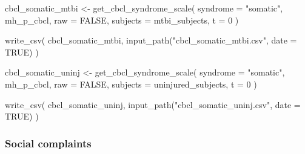 \documentclass[
  letterpaper,
  DIV=11,
  numbers=noendperiod]{scrreprt}
\newenvironment{Shaded}{\begin{snugshade}}{\end{snugshade}}
\newcommand{\AttributeTok}[1]{\textcolor[rgb]{0.40,0.45,0.13}{#1}}
\newcommand{\ConstantTok}[1]{\textcolor[rgb]{0.56,0.35,0.01}{#1}}
\newcommand{\DecValTok}[1]{\textcolor[rgb]{0.68,0.00,0.00}{#1}}
\newcommand{\FunctionTok}[1]{\textcolor[rgb]{0.28,0.35,0.67}{#1}}
\newcommand{\NormalTok}[1]{\textcolor[rgb]{0.00,0.23,0.31}{#1}}
\newcommand{\OtherTok}[1]{\textcolor[rgb]{0.00,0.23,0.31}{#1}}
\newcommand{\StringTok}[1]{\textcolor[rgb]{0.13,0.47,0.30}{#1}}
\begin{document}
\begin{Shaded}
\begin{Highlighting}[]
\NormalTok{cbcl\_somatic\_mtbi }\OtherTok{\textless{}{-}} \FunctionTok{get\_cbcl\_syndrome\_scale}\NormalTok{(}
    \AttributeTok{syndrome =} \StringTok{"somatic"}\NormalTok{,}
\NormalTok{    mh\_p\_cbcl,}
    \AttributeTok{raw =} \ConstantTok{FALSE}\NormalTok{,}
    \AttributeTok{subjects =}\NormalTok{ mtbi\_subjects,}
    \AttributeTok{t =} \DecValTok{0}
\NormalTok{)}

\FunctionTok{write\_csv}\NormalTok{(}
\NormalTok{    cbcl\_somatic\_mtbi,}
    \FunctionTok{input\_path}\NormalTok{(}\StringTok{"cbcl\_somatic\_mtbi.csv"}\NormalTok{, }\AttributeTok{date =} \ConstantTok{TRUE}\NormalTok{)}
\NormalTok{)}

\NormalTok{cbcl\_somatic\_uninj }\OtherTok{\textless{}{-}} \FunctionTok{get\_cbcl\_syndrome\_scale}\NormalTok{(}
    \AttributeTok{syndrome =} \StringTok{"somatic"}\NormalTok{,}
\NormalTok{    mh\_p\_cbcl,}
    \AttributeTok{raw =} \ConstantTok{FALSE}\NormalTok{,}
    \AttributeTok{subjects =}\NormalTok{ uninjured\_subjects,}
    \AttributeTok{t =} \DecValTok{0}
\NormalTok{)}

\FunctionTok{write\_csv}\NormalTok{(}
\NormalTok{    cbcl\_somatic\_uninj,}
    \FunctionTok{input\_path}\NormalTok{(}\StringTok{"cbcl\_somatic\_uninj.csv"}\NormalTok{, }\AttributeTok{date =} \ConstantTok{TRUE}\NormalTok{)}
\NormalTok{)}
\end{Highlighting}
\end{Shaded}

\subsubsection{Social complaints}\label{social-complaints}
\end{document}
